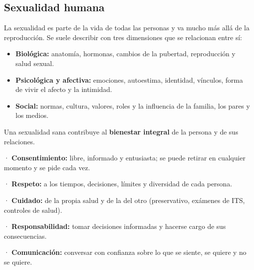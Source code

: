 \subsection{Sexualidad humana}
La sexualidad es parte de la vida de todas las personas y va mucho más allá de la reproducción. Se suele describir con tres dimensiones que se relacionan entre sí:

 
\begin{itemize}
  \item \textbf{Biológica:} anatomía, hormonas, cambios de la pubertad, reproducción y salud sexual.
  \item \textbf{Psicológica y afectiva:} emociones, autoestima, identidad, vínculos, forma de vivir el afecto y la intimidad.
  \item \textbf{Social:} normas, cultura, valores, roles y la influencia de la familia, los pares y los medios.
\end{itemize}
 

Una sexualidad sana contribuye al \textbf{bienestar integral} de la persona y de sus relaciones.

  
\begin{clave} · \textbf{Consentimiento:} libre, informado y entusiasta; se puede retirar en cualquier momento y se pide cada vez.\par · \textbf{Respeto:} a los tiempos, decisiones, límites y diversidad de cada persona.\par · \textbf{Cuidado:} de la propia salud y de la del otro (preservativo, exámenes de ITS, controles de salud).\par · \textbf{Responsabilidad:} tomar decisiones informadas y hacerse cargo de sus consecuencias.\par · \textbf{Comunicación:} conversar con confianza sobre lo que se siente, se quiere y no se quiere.\end{clave}
